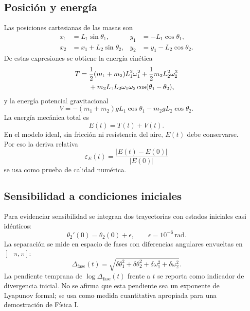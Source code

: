 \documentclass[reprint,amsmath,amssymb,aps,pra,nofootinbib,floatfix,showkeys]{revtex4-2}
\newcommand{\Deltafase}{\Delta_{\mathrm{fase}}}
\begin{document}
\subsection{Posici\'on y energ\'ia}

Las posiciones cartesianas de las masas son
\begin{align}
    x_1 &= L_1\sin\theta_1, &
    y_1 &= -L_1\cos\theta_1, \\
    x_2 &= x_1+L_2\sin\theta_2, &
    y_2 &= y_1-L_2\cos\theta_2.
    \label{eq:positions}
\end{align}
De estas expresiones se obtiene la energ\'ia cin\'etica
\begin{align}
    T={}&\frac{1}{2}(m_1+m_2)L_1^2\omega_1^2
    +\frac{1}{2}m_2L_2^2\omega_2^2 \notag\\
    &+m_2L_1L_2\omega_1\omega_2\cos(\theta_1-\theta_2),
    \label{eq:kinetic}
\end{align}
y la energ\'ia potencial gravitacional
\begin{equation}
    V=-(m_1+m_2)gL_1\cos\theta_1-m_2gL_2\cos\theta_2.
    \label{eq:potential}
\end{equation}
La energ\'ia mec\'anica total es
\begin{equation}
    E(t)=T(t)+V(t).
    \label{eq:total-energy}
\end{equation}
En el modelo ideal, sin fricci\'on ni resistencia del aire, $E(t)$ debe conservarse. Por eso la deriva relativa
\begin{equation}
    \varepsilon_E(t)=\frac{|E(t)-E(0)|}{|E(0)|}
    \label{eq:energy-drift}
\end{equation}
se usa como prueba de calidad num\'erica.

\subsection{Sensibilidad a condiciones iniciales}

Para evidenciar sensibilidad se integran dos trayectorias con estados iniciales casi id\'enticos:
\begin{equation}
    \theta_2'(0)=\theta_2(0)+\epsilon,
    \qquad \epsilon=10^{-6}\,\mathrm{rad}.
    \label{eq:perturbation}
\end{equation}
La separaci\'on se mide en espacio de fases con diferencias angulares envueltas en $[-\pi,\pi]$:
\begin{equation}
    \Deltafase(t)=
    \sqrt{
    \delta\theta_1^2+
    \delta\theta_2^2+
    \delta\omega_1^2+
    \delta\omega_2^2 }.
    \label{eq:phase-distance}
\end{equation}
La pendiente temprana de $\log\Deltafase(t)$ frente a $t$ se reporta como indicador de divergencia inicial. No se afirma que esta pendiente sea un exponente de Lyapunov formal; se usa como medida cuantitativa apropiada para una demostraci\'on de F\'isica I.
\end{document}
